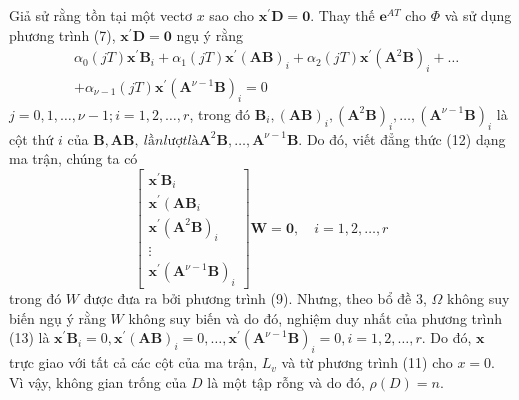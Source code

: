 \documentclass[12pt,a4paper]{article}
\begin{document}
Giả sử rằng tồn tại một vectơ $x$ sao cho $\mathbf{x}^{\prime} \mathbf{D}=\mathbf{0}$. Thay thế $\mathbf{e}^{A T}$ cho $\Phi$ và sử dụng phương trình (7), $\mathbf{x}^{\prime} \mathbf{D}=\mathbf{0}$ ngụ ý rằng
\begin{equation}\label{pt12}\tag{12}
	\begin{aligned}
		& \alpha_0(j T) \mathbf{x}^{\prime} \mathbf{B}_i+\alpha_1(j T) \mathbf{x}^{\prime}(\mathbf{A B})_i+\alpha_2(j T) \mathbf{x}^{\prime}\left(\mathbf{A}^2 \mathbf{B}\right)_i+\ldots \\
		&+\alpha_{\nu-1}(j T) \mathbf{x}^{\prime}\left(\mathbf{A}^{\nu-1} \mathbf{B}\right)_i=0
	\end{aligned}
\end{equation}
$j=0,1, \ldots, \nu-1 ; i=1,2, \ldots, r$, trong đó $\mathbf{B}_i,(\mathbf{A B})_i,\left(\mathbf{A}^2 \mathbf{B}\right)_i, \ldots,\left(\mathbf{A}^{\nu-1} \mathbf{B}\right)_i$ là cột thứ $i$ của $\mathbf{B}, \mathbf{A B}, \ lần lượt là \mathbf{A}^2 \mathbf{B}, \ldots, \mathbf{A}^{\nu-1} \mathbf{B}$. Do đó, viết đẳng thức (12) dạng ma trận, chúng ta có
\begin{equation}\tag{13}\label{pt13}
	\left[\begin{array}{c}
		\mathbf{x}^{\prime} \mathbf{B}_i \\
		\mathbf{x}^{\prime}\left(\mathbf{A} \mathbf{B}_i\right. \\
		\mathbf{x}^{\prime}\left(\mathbf{A}^2 \mathbf{B}\right)_i \\
		\vdots \\
		\mathbf{x}^{\prime}\left(\mathbf{A}^{\nu-1} \mathbf{B}\right)_i
	\end{array}\right] \mathbf{W}=\mathbf{0}, \quad i=1,2, \ldots, r
\end{equation}
trong đó $W$ được đưa ra bởi phương trình (9). Nhưng, theo bổ đề 3, $\Omega$ không suy biến ngụ ý rằng $W$ không suy biến và do đó,  nghiệm duy nhất của phương trình (13) là $\mathbf{x}^{\prime} \mathbf{B}_i=0,
\mathbf{x}^{\prime}(\mathbf{A B})_i=0, \ldots, \mathbf {x}^{\prime}\left(\mathbf{A}^{\nu-1} \mathbf{B}\right)_i=0, i=1,2, \ldots, r$. Do đó, $\mathbf{x}$ trực giao với tất cả các cột của ma trận, $L_v$ và  từ phương trình (11) cho $x=0$. Vì vậy, không gian trống của $D$ là một tập rỗng và do đó, $\rho(D)=n$.
\end{document}
